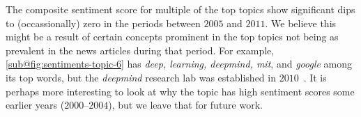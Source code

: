 The composite sentiment score for multiple of the top topics show
significant dips to (occassionally) zero in the periods between
$2005$ and $2011$. We believe this might be a result of
certain concepts prominent in the top topics not being
as prevalent in the news articles during that period.
For example, \cref{sub@fig:sentiments-topic-6} has \emph{deep, learning, deepmind, mit},
and \emph{google}
among its top words, but the \emph{deepmind} research lab was established
in $2010$~\cite{deepmind-about}. It is perhaps more interesting to look at
why the topic has high sentiment scores some earlier years ($2000$--$2004$),
but we leave that for future work.
